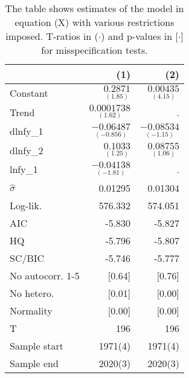 \begin{table}[tbph]
\begin{center}
\begin{tabular}{lrr}
\hline
& (1) & (2) \\
\hline
Constant & $\underset{(1.85)}{0.2871}$ & $\underset{(4.15)}{0.00435}$ \\
Trend & $\underset{(1.62)}{0.0001738}$ & . \\
dlnfy\_1 & $\underset{(-0.856)}{-0.06487}$ & $\underset{(-1.15)}{-0.08534}$ \\
dlnfy\_2 & $\underset{(1.25)}{0.1033}$ & $\underset{(1.06)}{0.08755}$ \\
lnfy\_1 & $\underset{(-1.81)}{-0.04138}$ & . \\
\hline
$\hat{\sigma}$ & 0.01295 & 0.01304 \\
Log-lik. & 576.332 & 574.051 \\
\hline
AIC & -5.830 & -5.827 \\
HQ & -5.796 & -5.807 \\
SC/BIC & -5.746 & -5.777 \\
\hline
No autocorr. 1-5 & [0.64] & [0.76] \\
No hetero. & [0.01] & [0.00] \\
Normality & [0.00] & [0.00] \\
\hline
T & 196 & 196 \\
Sample start & 1971(4) & 1971(4) \\
Sample end & 2020(3) & 2020(3) \\
\hline
\end{tabular}
\end{center}
\vspace{1em}
\caption{The table shows estimates of the model in equation (X) with various restrictions imposed. T-ratios in ($\cdot$) and p-values in [$\cdot$] for misspecification tests.}
\end{table}